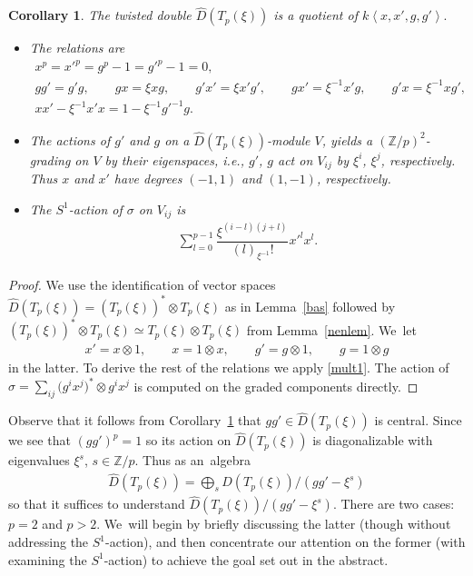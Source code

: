 \documentclass[10pt,a4paper]{amsart}
\numberwithin{equation}{section}
\newtheorem{Corollary}[Theorem]{Corollary}
\newcommand{\ot}{\otimes}
\newcommand{\zp}{\mathbb{Z}/p}
\begin{document}
\begin{Corollary}\label{gens}The twisted double $\widehat{D}(T_p(\xi))$ is a quotient of $k\left\langle x,x',g,g'\right\rangle.$

\begin{itemize}\itemsep=0pt
\item The relations are
\begin{gather*}
x^p=x'^p=g^p-1=g'^p-1=0,
\\
gg'=g'g,\qquad
gx=\xi xg,\qquad
g'x'=\xi x'g',\qquad
gx'=\xi^{-1} x'g, \qquad
g'x=\xi^{-1} xg',
\\
xx'-\xi^{-1}x'x=1-\xi^{-1}g'^{-1}g.
\end{gather*}

\item The actions of $g'$ and $g$ on a $\widehat{D}(T_p(\xi))$-module $V$, yields a $(\mathbb{Z}/p)^2$-grading on $V$ by their eigenspaces, i.e., $g'$, $g$ act on $V_{ij}$ by $\xi^i$, $\xi^j$, respectively. Thus $x$ and $x'$ have degrees $(-1,1)$ and $(1,-1)$, respectively.

\item The $S^1$-action of $\sigma$ on $V_{ij}$ is
\begin{gather}\label{sigmaaction}
\sum_{l=0}^{p-1}\dfrac{\xi^{(i-l)(j+l)}}{(l)_{\xi^{-1}}!}x'^lx^l.
\end{gather}
\end{itemize}
\end{Corollary}

\begin{proof}
We use the identification of vector spaces $\widehat{D}(T_p(\xi))=(T_p(\xi))^*\ot T_p(\xi)$ as in Lemma~\ref{bas} followed by $(T_p(\xi))^*\ot T_p(\xi) \simeq T_p(\xi)\ot T_p(\xi)$ from Lemma~\ref{nenlem}. We~let
\begin{gather}
x'=x\ot 1, \qquad
x=1\ot x, \qquad
g'=g\ot 1, \qquad
g=1\ot g
\end{gather}
in the latter. To derive the rest of the relations we apply \eqref{mult1}. The action of $\sigma=\sum_{ij}\big(g^ix^j\big)^*\ot g^ix^j$ is computed on the graded components directly.
\end{proof}

Observe that it follows from Corollary~\ref{gens} that $gg'\in\widehat{D}(T_p(\xi))$ is central. Since we see that $(gg')^p=1$ so its action on $\widehat{D}(T_p(\xi))$ is diagonalizable with eigenvalues $\xi^s$, $s\in\zp$. Thus as an~algebra
\begin{gather}\label{split}
\widehat{D}(T_p(\xi))=\bigoplus_s \widehat{D}(T_p(\xi))/(gg'-\xi^s)
\end{gather}
so that it suffices to understand $\widehat{D}(T_p(\xi))/(gg'-\xi^s)$. There are two cases: $p=2$ and $p>2$. We~will begin by briefly discussing the latter (though without addressing the $S^1$-action), and then concentrate our attention on the former (with examining the $S^1$-action) to achieve the goal set out in the abstract.
\end{document}

